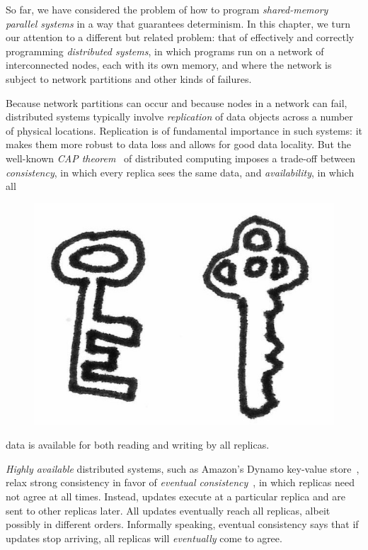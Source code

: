 So far, we have considered the problem of how to
program \emph{shared-memory parallel systems} in a way that guarantees
determinism.  In this chapter, we turn our attention to a different
but related problem: that of effectively and correctly
programming \emph{distributed systems}, in which programs run on a
network of interconnected nodes, each with its own memory, and where
the network is subject to network partitions and other kinds of
failures.

Because network partitions can occur and because nodes in a network
can fail, distributed systems typically involve \emph{replication} of
data objects across a number of physical locations.  Replication is of
fundamental importance in such systems: it makes them more robust to
data loss and allows for good data locality.  But the well-known
\emph{CAP theorem}~\cite{gilbert-lynch-cap, BrewerCAPBlog} of
distributed computing imposes a trade-off between \emph{consistency},
in which every replica sees the same data, and \emph{availability}, in
which all
\ifdefined\DISSERTATION
\begin{figure}
\vspace{-1em}
\begin{center}
  \includegraphics[scale=0.15]{../illustrations/keys}
\end{center}
\vspace{-1em}
\end{figure}
\fi
data is available for both reading and writing by all
replicas.

\emph{Highly available} distributed systems, such as
Amazon's Dynamo key-value store~\cite{dynamo}, relax strong
consistency in favor of \emph{eventual consistency}~\cite{vogels-ec},
in which replicas need not agree at all times.  Instead, updates
execute at a particular replica and are sent to other replicas
later. All updates eventually reach all replicas, albeit possibly in
different orders.  Informally speaking, eventual consistency says that
if updates stop arriving, all replicas will \emph{eventually} come to
agree.

